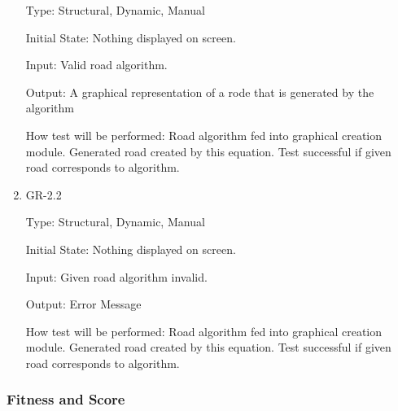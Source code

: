 \documentclass[12pt, titlepage]{article}
\begin{document}
\begin{enumerate}
Type: Structural, Dynamic, Manual
					
Initial State: Nothing displayed on screen.
					
Input:  Valid road algorithm.
					
Output: A graphical representation of a rode that is generated by the algorithm
					
How test will be performed: Road algorithm fed into graphical creation module. Generated road created by this equation. Test successful if given road corresponds to algorithm.

\item{GR-2.2\\}

Type: Structural, Dynamic, Manual
					
Initial State: Nothing displayed on screen.
					
Input: Given road algorithm invalid.
					
Output: Error Message
					
How test will be performed: Road algorithm fed into graphical creation module. Generated road created by this equation. Test successful if given road corresponds to algorithm.

\end{enumerate}

\subsubsection{Fitness and Score}
\end{document}
